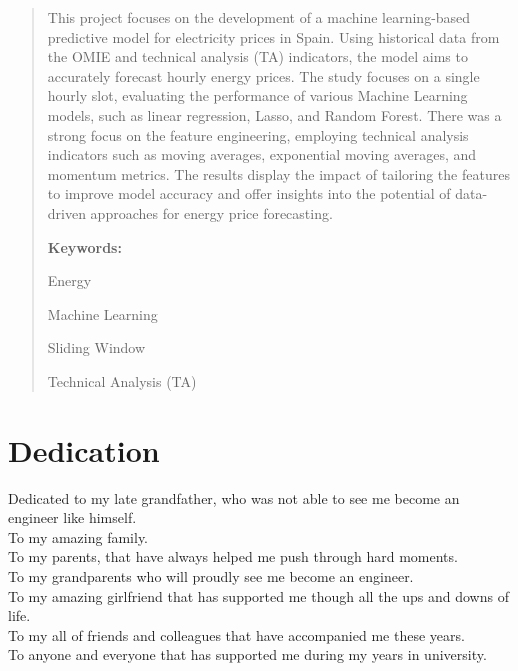 \documentclass[12pt]{report} %
\begin{document}
\renewcommand\abstractname{\large\bfseries\filcenter\uppercase{Summary}}
\begin{abstract}
\thispagestyle{plain}
\setcounter{page}{3}
	
    This project focuses on the development of a machine learning-based predictive model for electricity prices in Spain. Using historical data from the OMIE and technical analysis (TA) indicators, the model aims to accurately forecast hourly energy prices. The study focuses on a single hourly slot, evaluating the performance of various Machine Learning models, such as linear regression, Lasso, and Random Forest. There was a strong focus on the feature engineering, employing technical analysis indicators such as moving averages, exponential moving averages, and momentum metrics. The results display the impact of tailoring the features to improve model accuracy and offer insights into the potential of data-driven approaches for energy price forecasting.

\bigskip
	\textbf{Keywords:} %
            
            Energy
            
            Machine Learning
            
            Sliding Window

            Technical Analysis (TA)

            
	
	\vfill
\end{abstract}



\newpage %
\thispagestyle{empty}
\mbox{}



\chapter*{Dedication}

\setcounter{page}{5}

\noindent Dedicated to my late grandfather, who was not able to see me become an engineer like himself.\\
To my amazing family.\\
To my parents, that have always helped me push through hard moments.\\
To my grandparents who will proudly see me become an engineer.\\
To my amazing girlfriend that has supported me though all the ups and downs of life.\\
To my all of friends and colleagues that have accompanied me these years.\\
To anyone and everyone that has supported me during my years in university.\\
\end{document}
